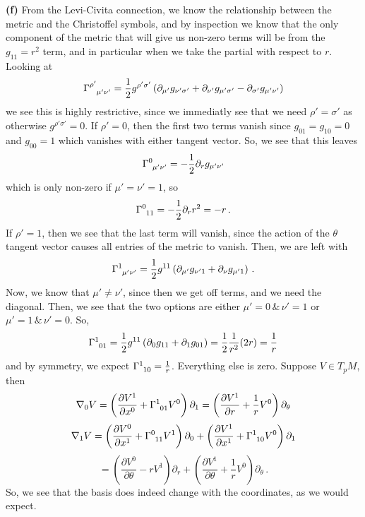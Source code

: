 \documentclass[10pt]{article}
\begin{document}
\textbf{(f)} From the Levi-Civita connection, we know the relationship between the metric and the Christoffel symbols, and by inspection we know that the only component of the metric that will give us non-zero terms will be from the $g_{11} = r^{2}$ term, and in particular when we take the partial with respect to $r$. Looking at
\[ \tensor{\Gamma}{^{\rho'}_{\mu'\nu'}} = \frac{1}{2}g^{\rho'\sigma'}\left(\partial_{\mu'}g_{\nu'\sigma'} + \partial_{\nu'}g_{\mu'\sigma'} - \partial_{\sigma'}g_{\mu'\nu'}\right)\]
we see this is highly restrictive, since we immediatly see that we need $\rho' = \sigma'$ as otherwise $g^{\rho'\sigma'} = 0$. If $\rho' = 0$, then the first two terms vanish since $g_{01}=g_{10} =0$ and $g_{00} = 1$ which vanishes with either tangent vector. So, we see that this leaves
\[ \tensor{\Gamma}{^{0}_{\mu'\nu'}} = -\frac{1}{2}\partial_{r}g_{\mu'\nu'} \]
which is only non-zero if $\mu'=\nu' = 1$, so
\[ \tensor{\Gamma}{^{0}_{11}} = -\frac{1}{2}\partial_{r}r^{2} = -r \, .\]
If $\rho' = 1$, then we see that the last term will vanish, since the action of the $\theta$ tangent vector causes all entries of the metric to vanish. Then, we are left with
\[ \tensor{\Gamma}{^{1}_{\mu'\nu'}} = \frac{1}{2}g^{11}\left(\partial_{\mu'}g_{\nu'1} + \partial_{\nu}g_{\mu'1}\right)\, .\]
Now, we know that $\mu' \neq \nu'$, since then we get off terms, and we need the diagonal. Then, we see that the two options are either $\mu' = 0 \, \& \, \nu' = 1$ or $\mu' = 1 \, \& \, \nu' = 0$. So,
\[ \tensor{\Gamma}{^{1}_{01}} = \frac{1}{2}g^{11}\left(\partial_{0}g_{11} + \partial_{1}g_{01}\right) = \frac{1}{2}\frac{1}{r^{2}}(2r) = \frac{1}{r} \]
and by symmetry, we expect $\tensor{\Gamma}{^{1}_{10}} = \frac{1}{r}$. Everything else is zero. Suppose $V \in T_{p}M$, then
\[ \nabla_{0}V = \left(\frac{\partial V^{1}}{\partial x^{0}} + \tensor{\Gamma}{^{1}_{01}}V^{0}\right)\partial_{1} = \left(\frac{\partial V^{1}}{\partial r} + \frac{1}{r}V^{0}\right)\partial_{\theta}\]
\[ \nabla_{1}V = \left(\frac{\partial V^{0}}{\partial x^{1}} + \tensor{\Gamma}{^{0}_{11}}V^{1}\right)\partial_{0} + \left(\frac{\partial V^{1}}{\partial x^{1}} + \tensor{\Gamma}{^{1}_{10}}V^{0}\right)\partial_{1}\]
\[ = \left(\frac{\partial V^{0}}{\partial \theta} - rV^{1}\right)\partial_{r} + \left(\frac{\partial V^{1}}{\partial \theta} + \frac{1}{r}V^{0}\right)\partial_{\theta}\, .\]
So, we see that the basis does indeed change with the coordinates, as we would expect.
\end{document}

